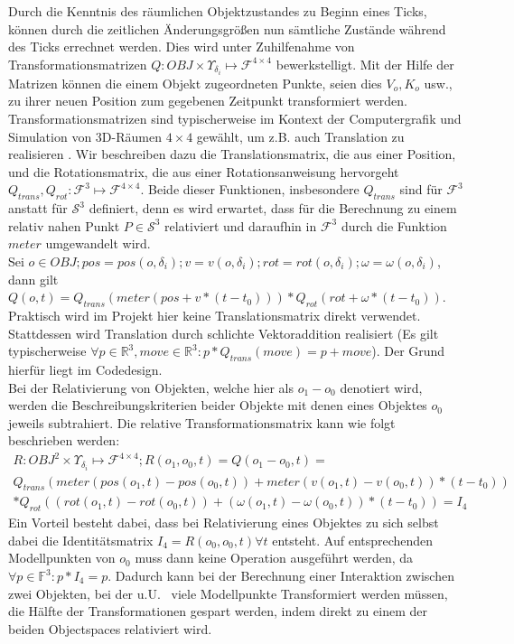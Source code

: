 Durch die Kenntnis des räumlichen Objektzustandes zu Beginn eines Ticks, können durch die zeitlichen Änderungsgrößen nun sämtliche Zustände während des Ticks errechnet werden.
Dies wird unter Zuhilfenahme von Transformationsmatrizen $Q: OBJ \times \Upsilon_{\delta_i} \mapsto \mathcal{F}^{4\times 4}$ bewerkstelligt. Mit der Hilfe der Matrizen können die einem Objekt zugeordneten Punkte, seien dies $V_o, K_o$ usw., zu ihrer neuen Position zum gegebenen Zeitpunkt transformiert werden. Transformationsmatrizen sind typischerweise im Kontext der Computergrafik und Simulation von 3D-Räumen $4\times 4$ gewählt, um z.B. auch Translation zu realisieren \cite[ch. 4.4.1, p.76]{fourcrossfour}. Wir beschreiben dazu die 
Translationsmatrix, die aus einer Position, und die Rotationsmatrix, die aus einer Rotationsanweisung hervorgeht $Q_{trans}, Q_{rot}:\mathcal{F}^3 \mapsto \mathcal{F}^{4\times 4}$. Beide dieser Funktionen, insbesondere $Q_{trans}$ sind für $\mathcal{F}^3$ anstatt für $\mathcal{S}^3$ definiert, denn es wird erwartet, dass für die Berechnung zu einem relativ nahen Punkt $P \in\mathcal{S}^3$ relativiert und daraufhin in $\mathcal{F}^3$ durch die Funktion $meter$ umgewandelt wird.\\
Sei $o \in OBJ; pos = pos(o, \delta_i); v = v(o, \delta_i); rot = rot(o, \delta_i); \omega = \omega(o, \delta_i)$, dann gilt
$Q(o, t) = Q_{trans}(meter(pos + v * (t-t_0))) * Q_{rot}(rot + \omega * (t - t_0))$.\\
Praktisch wird im Projekt hier keine Translationsmatrix direkt verwendet. Stattdessen wird Translation durch schlichte Vektoraddition realisiert (Es gilt typischerweise $\forall p \in\mathbb{R}^3, move \in \mathbb{R}^3 : p * Q_{trans}(move) = p + move$). Der Grund hierfür liegt im Codedesign.\\
Bei der Relativierung von Objekten, welche hier als $o_1 - o_0$ denotiert wird, werden die Beschreibungskriterien beider Objekte mit denen eines Objektes $o_0$ jeweils subtrahiert. Die relative Transformationsmatrix kann wie folgt beschrieben werden:
\begin{align}
R: OBJ^2 \times \Upsilon_{\delta_i} \mapsto \mathcal{F}^{4\times 4}; R(o_1, o_0, t) = Q(o_1 - o_0, t) = \\
Q_{trans}( meter(  pos(o_1, t)-pos(o_0, t) ) + meter(v(o_1, t)-v(o_0, t)) * (t-t_0) ) \\
* Q_{rot}((rot(o_1, t)-rot(o_0, t)) + (\omega(o_1, t)-\omega(o_0, t)) * (t-t_0))= I_4
\end{align}
Ein Vorteil besteht dabei, dass bei Relativierung eines Objektes zu sich selbst dabei die Identitätsmatrix $I_4 = R(o_0, o_0, t) \forall t$ entsteht. Auf entsprechenden Modellpunkten von $o_0$ muss dann keine Operation ausgeführt werden, da $\forall p\in \mathbb{F}^3: p*I_4=p$. Dadurch kann bei der Berechnung einer Interaktion zwischen zwei Objekten, bei der u.U.~ viele Modellpunkte Transformiert werden müssen, die Hälfte der Transformationen gespart werden, indem direkt zu einem der beiden Objectspaces relativiert wird.\\
